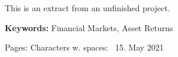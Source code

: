 \begin{titlepage}

This is an extract from an unfinished project. 

\begin{minipage}{1\textwidth}


\vspace{5mm}
\textbf{Keywords:} Financial Markets, Asset Returns
\end{minipage}

\vfill %


Pages: \pageref{LastPage} \qquad Characters w. spaces: \qquad
\makeatletter
\ 15. May 2021
\makeatother


\end{titlepage}